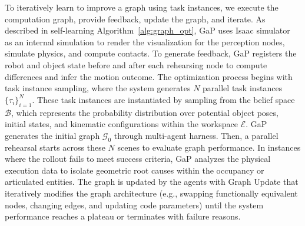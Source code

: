 To iteratively learn to improve a graph using task instances, we execute the computation graph, provide feedback, update the graph, and iterate. 
As described in self-learning Algorithm~\ref{alg:graph_opt}, GaP uses Isaac simulator~\cite{NVIDIA_Isaac_Sim} as an internal simulation to render the visualization for the perception nodes, simulate physics, and compute contacts. 
To generate feedback, GaP registers the robot and object state before and after each rehearsing node to compute differences and infer the motion outcome. 
The optimization process begins with task instance sampling, where the system generates $N$ parallel task instances  $\{{\tau}_i\}_{i=1}^N$. These task instances are instantiated by sampling from the belief space $\mathcal{B}$, which represents the probability distribution over potential object poses, initial states, and kinematic configurations within the workspace $\mathcal{E}$. 
GaP generates the initial graph $\mathcal{G}_0$ through multi-agent harness. 
Then, a parallel rehearsal starts across these $N$ scenes to evaluate graph performance. In instances where the rollout fails to meet success criteria, GaP analyzes the physical execution data to isolate geometric root causes within the occupancy or articulated entities. The graph is updated by the agents with Graph Update that iteratively modifies the graph architecture (e.g., swapping functionally equivalent nodes, changing edges, and updating code parameters) until the system performance reaches a plateau or terminates with failure reasons.



    
    
    

